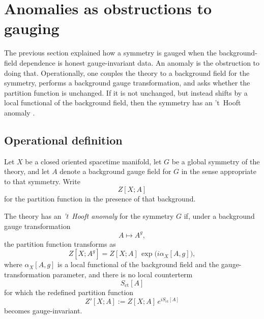 \section{Anomalies as obstructions to gauging}\label{sec:anomaly-definition}

The previous section explained how a symmetry is gauged when the background-field dependence is honest gauge-invariant data. An anomaly is the obstruction to doing that. Operationally, one couples the theory to a background field for the symmetry, performs a background gauge transformation, and asks whether the partition function is unchanged. If it is not unchanged, but instead shifts by a local functional of the background field, then the symmetry has an 't~Hooft anomaly \cite{GKSW2015,Bhardwaj2023Lectures}.

\subsection{Operational definition}

\begin{assumption}\label{ass:anomaly-background}
Let $X$ be a closed oriented spacetime manifold, let $G$ be a global symmetry of the theory, and let $A$ denote a background gauge field for $G$ in the sense appropriate to that symmetry. Write
\begin{equation*}
Z[X;A]
\end{equation*}
for the partition function in the presence of that background.
\end{assumption}

\begin{definition}\label{def:tHooft-anomaly}
The theory has an \emph{'t~Hooft anomaly} for the symmetry $G$ if, under a background gauge transformation
\begin{equation*}
A\longmapsto A^g,
\end{equation*}
the partition function transforms as
\begin{equation}\label{eq:anomaly-phase}
Z[X;A^g]
=
Z[X;A]\,
\exp\!\bigl(i\alpha_X[A,g]\bigr),
\end{equation}
where $\alpha_X[A,g]$ is a local functional of the background field and the gauge-transformation parameter, and there is no local counterterm
\begin{equation*}
S_{\mathrm{ct}}[A]
\end{equation*}
for which the redefined partition function
\begin{equation*}
Z'[X;A]:=Z[X;A]\,e^{iS_{\mathrm{ct}}[A]}
\end{equation*}
becomes gauge-invariant.
\end{definition}

